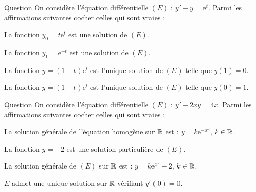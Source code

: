 \begin{multi}[multiple,feedback=
{On vérifie que \(y_0=t\mathrm{e}^{t}\) est une solution de \((E)\). On vérifie aussi que \(\displaystyle y=(1+t)\mathrm{e}^{t}\) est une solution de \((E)\) et en plus \(y(0)=1\). Cette dernière est donc l'unique solution de \((E)\) telle que \(y(0)=1\).
}]{Question}
On considère l'équation différentielle \((E)\) : \(y'-y=\mathrm{e}^t\). Parmi les affirmations suivantes cocher celles qui sont vraies :

    \item* La fonction \(\displaystyle y_0=t\mathrm{e}^{t}\) est une solution de \((E)\).
    \item La fonction \(\displaystyle y_1=\mathrm{e}^{-t}\) est une solution de \((E)\).
    \item La fonction \(\displaystyle y=(1-t)\mathrm{e}^{t}\) est l'unique solution de \((E)\) telle que \(y(1)=0\).
    \item* La fonction \(\displaystyle y=(1+t)\mathrm{e}^{t}\) est l'unique solution de \((E)\) telle que \(y(0)=1\).
\end{multi}


\begin{multi}[multiple,feedback=
{La solution générale de l'équation homogène est : \(Y=k\mathrm{e}^{x^2}\), \(k\in \Rr\), et \(y_0=-2\) est une solution particulière. Donc la solution générale de \((E)\) sur \(\Rr\) est : \(y=k\mathrm{e}^{x^2}-2\), \(k\in \Rr\). Toute solution de \((E)\) vérifie \(y'(0)=0\).
}]{Question}
On considère l'équation différentielle \((E)\) : \(\displaystyle y'-2xy=4x\).  Parmi les affirmations suivantes cocher celles qui sont vraies :

    \item La solution générale de l'équation homogène sur \(\Rr\) est : \(y=k\mathrm{e}^{-x^2}\), \(k\in \Rr\).
    \item* La fonction \(y=-2\) est une solution particulière de \((E)\).
    \item* La solution générale de \((E)\) sur \(\Rr\) est : \(y=k\mathrm{e}^{x^2}-2\), \(k\in \Rr\).
    \item \(E\) admet une unique solution sur \(\Rr\) vérifiant \(y'(0)=0\).
\end{multi}


